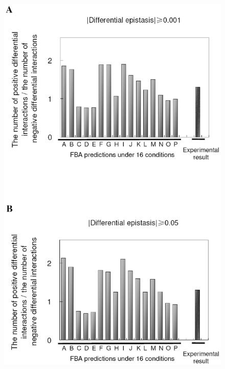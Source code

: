 \documentclass[letterpaper]{article}
\begin{document}
\begin{figure}[!htb]
\centering
\includegraphics[height=0.8\textheight]{envFigure_S1}
\caption{\eeFBAfigSOneCap}
\label{fig:eefS1}
\end{figure}
\end{document}
